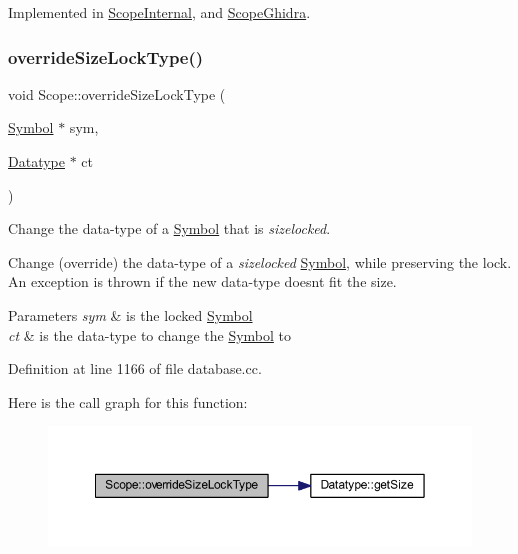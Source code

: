 Implemented in \mbox{\hyperlink{class_scope_internal_a193e6fb792e7cad6e451c8ecf2f7e589}{Scope\+Internal}}, and \mbox{\hyperlink{class_scope_ghidra_a458977d1e0a9826d5cf7bca487ecf327}{Scope\+Ghidra}}.

\mbox{\label{class_scope_a0a05df4f8df1764859bec8372d64b1ee}} 
\subsubsection{\texorpdfstring{overrideSizeLockType()}{overrideSizeLockType()}}
{\footnotesize\ttfamily void Scope\+::override\+Size\+Lock\+Type (\begin{DoxyParamCaption}\item[{\mbox{\hyperlink{class_symbol}{Symbol}} $\ast$}]{sym,  }\item[{\mbox{\hyperlink{class_datatype}{Datatype}} $\ast$}]{ct }\end{DoxyParamCaption})}



Change the data-\/type of a \mbox{\hyperlink{class_symbol}{Symbol}} that is {\itshape sizelocked}. 

Change (override) the data-\/type of a {\itshape sizelocked} \mbox{\hyperlink{class_symbol}{Symbol}}, while preserving the lock. An exception is thrown if the new data-\/type doesn\textquotesingle{}t fit the size. 
\begin{DoxyParams}{Parameters}
{\em sym} & is the locked \mbox{\hyperlink{class_symbol}{Symbol}} \\
\hline
{\em ct} & is the data-\/type to change the \mbox{\hyperlink{class_symbol}{Symbol}} to \\
\hline
\end{DoxyParams}


Definition at line 1166 of file database.\+cc.

Here is the call graph for this function\+:
\nopagebreak
\begin{figure}[H]
\begin{center}
\leavevmode
\includegraphics[width=350pt]{class_scope_a0a05df4f8df1764859bec8372d64b1ee_cgraph}
\end{center}
\end{figure}
\mbox{\label{class_scope_a865f1dd5e0c7dc9a5e65189cc7be2c9b}} 

